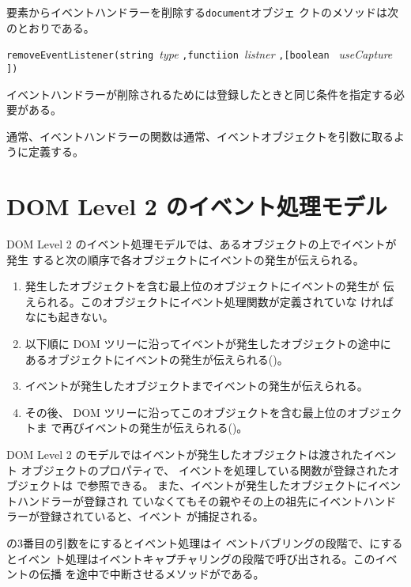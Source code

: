 要素からイベントハンドラーを削除する\texttt{document}オブジェ
クトのメソッドは次のとおりである。

\texttt{removeEventListener(string }{\sl type}
\texttt{,functiion }{\sl listner}
\texttt{,[boolean }
{\sl useCapture}
\texttt{])}

\noindent
イベントハンドラーが削除されるためには登録したときと同じ条件を指定する必
要がある。

通常、イベントハンドラーの関数は通常、イベントオブジェクトを引数に取るよ
うに定義する。
\iffalse
このオブジェクトは表%
\ref{mouseeventmethod}のようなプロパティ%
を持つ。
\fi
\section{DOM Level 2 のイベント処理モデル}
DOM Level 2 のイベント処理モデルでは、あるオブジェクトの上でイベントが発生
すると次の順序で各オブジェクトにイベントの発生が伝えられる。
\begin{enumerate}
 \item 発生したオブジェクトを含む最上位のオブジェクトにイベントの発生が
       伝えられる。このオブジェクトにイベント処理関数が定義されていな
       ければなにも起きない。
 \item 以下順に DOM ツリーに沿ってイベントが発生したオブジェクトの途中に
       あるオブジェクトにイベントの発生が伝えられる()。
 \item イベントが発生したオブジェクトまでイベントの発生が伝えられる。
 \item その後、
       DOM ツリーに沿ってこのオブジェクトを含む最上位のオブジェクトま
       で再びイベントの発生が伝えられる()。
\end{enumerate}
DOM Level 2 のモデルではイベントが発生したオブジェクトは渡されたイベント
オブジェクトのプロパティで、
イベントを処理している関数が登録されたオブジェクトは
で参照できる。
%
また、イベントが発生したオブジェクトにイベントハンドラーが登録され
ていなくてもその親やその上の祖先にイベントハンドラーが登録されていると、イベント
が捕捉される。


の3番目の引数をにするとイベント処理はイ
ベントバブリングの段階で、にするとイベン
ト処理はイベントキャプチャリングの段階で呼び出される。このイベントの伝播
を途中で中断させるメソッドがである。

